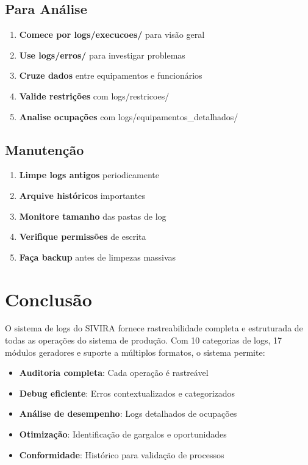 \documentclass[11pt,a4paper]{article}
\begin{document}
\subsection{Para Análise}

\begin{enumerate}
    \item \textbf{Comece por logs/execucoes/} para visão geral
    \item \textbf{Use logs/erros/} para investigar problemas
    \item \textbf{Cruze dados} entre equipamentos e funcionários
    \item \textbf{Valide restrições} com logs/restricoes/
    \item \textbf{Analise ocupações} com logs/equipamentos\_detalhados/
\end{enumerate}

\subsection{Manutenção}

\begin{enumerate}
    \item \textbf{Limpe logs antigos} periodicamente
    \item \textbf{Arquive históricos} importantes
    \item \textbf{Monitore tamanho} das pastas de log
    \item \textbf{Verifique permissões} de escrita
    \item \textbf{Faça backup} antes de limpezas massivas
\end{enumerate}

\newpage

\section{Conclusão}

O sistema de logs do SIVIRA fornece rastreabilidade completa e estruturada de todas as operações do sistema de produção. Com 10 categorias de logs, 17 módulos geradores e suporte a múltiplos formatos, o sistema permite:

\begin{itemize}
    \item \textbf{Auditoria completa}: Cada operação é rastreável
    \item \textbf{Debug eficiente}: Erros contextualizados e categorizados
    \item \textbf{Análise de desempenho}: Logs detalhados de ocupações
    \item \textbf{Otimização}: Identificação de gargalos e oportunidades
    \item \textbf{Conformidade}: Histórico para validação de processos
\end{itemize}
\end{document}
